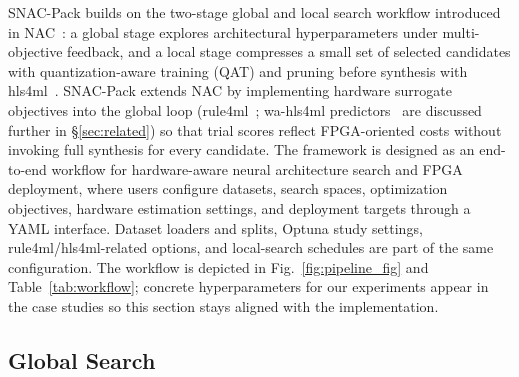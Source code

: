\documentclass[11pt]{article}
\begin{document}
SNAC-Pack builds on the two-stage global and local search workflow introduced in NAC~\citep{Weitz_2025}: a global stage explores architectural hyperparameters under multi-objective feedback, and a local stage compresses a small set of selected candidates with quantization-aware training (QAT) and pruning before synthesis with hls4ml~\citep{hls4ml,fastml_hls4ml,10.1145/3801979}.
SNAC-Pack extends NAC by implementing hardware surrogate objectives into the global loop (rule4ml~\citep{rahimifar2025rule4ml}; wa-hls4ml predictors~\citep{hawks2025wahls4mlbenchmarksurrogatemodels} are discussed further in \S\ref{sec:related}) so that trial scores reflect FPGA-oriented costs without invoking full synthesis for every candidate.
The framework is designed as an end-to-end workflow for hardware-aware neural architecture search and FPGA deployment, where users configure datasets, search spaces, optimization objectives, hardware estimation settings, and deployment targets through a YAML interface.
Dataset loaders and splits, Optuna study settings, rule4ml/hls4ml-related options, and local-search schedules are part of the same configuration.
The workflow is depicted in Fig.~\ref{fig:pipeline_fig} and Table~\ref{tab:workflow}; concrete hyperparameters for our experiments appear in the case studies so this section stays aligned with the implementation.

\subsection{Global Search}
\label{sec:method-global}
\end{document}
